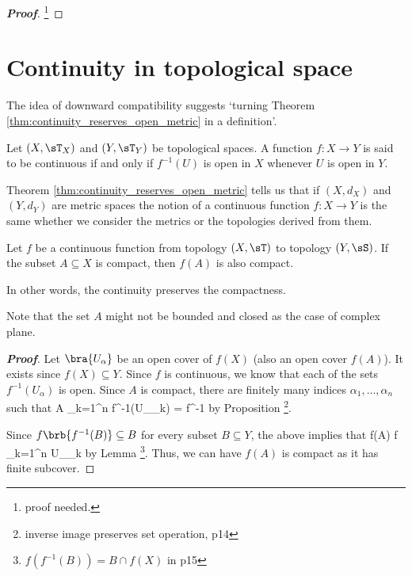 \begin{proof}[\bf Proof]
\footnote{proof needed.}
\end{proof}

\section{Continuity in topological space}%

The idea of downward compatibility suggests `turning Theorem \ref{thm:continuity_reserves_open_metric} in a definition'.

\begin{definition}\label{def:continuous_topological_space}
Let $(X,\sT_X)$ and $(Y,\sT_Y)$ be topological spaces. A function $f:X\to Y$ is said to be continuous if and only if $f^{-1}(U)$ is open in $X$ whenever $U$ is open in $Y$.
\end{definition}

\begin{remark}
Theorem \ref{thm:continuity_reserves_open_metric} tells us that if $(X,d_X)$ and $(Y, d_Y)$ are metric spaces the notion of a continuous function $f:X \to Y$ is the same whether we consider the metrics or the topologies derived from them.
\end{remark}



\begin{theorem}
Let $f$ be a continuous function from topology $(X,\sT)$ to topology $(Y,\sS)$. If the subset $A\subseteq X$ is compact, then $f(A)$ is also compact.

In other words, the continuity preserves the compactness.
\end{theorem}

\begin{remark}
Note that the set $A$ might not be bounded and closed as the case of complex plane.
\end{remark}

\begin{proof}[\bf Proof]
Let $\bra{U_\alpha}$ be an open cover of $f(X)$ (also an open cover $f(A)$). It exists since $f(X) \subseteq Y$. Since $f$ is continuous, we know that each of the sets $f^{-1}(U_\alpha)$ is open. Since $A$ is compact, there are finitely many indices $\alpha_1,\dots,\alpha_n$ such that
\be
A \subseteq \bigcup_{k=1}^n f^{-1}(U_{\alpha_k}) = f^{-1}
\ee
by Proposition \footnote{inverse image preserves set operation, p14}.

Since $f\brb{f^{-1}(B)} \subseteq B$ for every subset $B \subseteq Y$, the above implies that
\be
f(A) \subseteq f \subseteq \bigcup_{k=1}^n U_{\alpha_k}
\ee
by Lemma \footnote{$f(f^{-1}(B)) = B\cap f(X)$ in p15}. Thus, we can have $f(A)$ is compact as it has finite subcover.
\end{proof}



